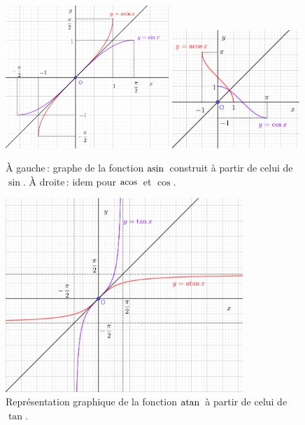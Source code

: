 		\begin{figure}
			\includegraphics[width=0.55\textwidth]{image/fct_trigo/courbe_asin.png} \includegraphics[width=0.43\textwidth]{image/fct_trigo/courbe_acos.png}
			\caption{À gauche\,: graphe de la fonction $\mathrm{asin\,}$ construit à partir de celui de $\sin$. À droite\,: idem pour $\mathrm{acos\,}$ et $\cos$.}
			\label{fig_asincos}
		\end{figure}
		\begin{figure}
			\includegraphics[width=0.8\textwidth]{image/fct_trigo/courbe_atan.png}
			\caption{Représentation graphique de la fonction $\mathrm{atan\,}$ à partir de celui de $\tan$.}
			\label{fig_atan}
		\end{figure}

